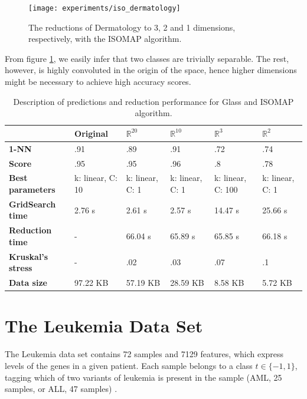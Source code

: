 \begin{figure}[H]
	\centering
	\captionsetup{justification=centering}
	\texttt{[image: experiments/iso\_dermatology]}
	\caption{The reductions of Dermatology to 3, 2 and 1 dimensions, respectively, with the ISOMAP algorithm.}
	\label{fig:dsdermatologyiso}
\end{figure}

From figure \ref{fig:dsdermatologyiso}, we easily infer that two classes are trivially separable. The rest, however, is highly convoluted in the origin of the space, hence higher dimensions might be necessary to achieve high accuracy scores.

\begin{table}[H]
	\centering
	
	\begin{tabular}{|p{.15\linewidth}|p{.12\linewidth}|p{.12\linewidth}|p{.12\linewidth}|p{.12\linewidth}|p{.12\linewidth}|}
		\hline
		& \textbf{Original} & $\mathbb{R}^{20}$ & $\mathbb{R}^{10}$ & $\mathbb{R}^3$ & $\mathbb{R}^2$ \\\hline
		\textbf{1-NN} & .91 & .89 & .91 & .72 & .74 \\\hline
		\textbf{Score} & .95 & .95 & .96 & .8 & .78 \\\hline
		\textbf{Best parameters} & k: linear, C: 10 & k: linear, C: 1 & k: linear, C: 1 & k: linear, C: 100 & k: linear, C: 1\\\hline
		\textbf{GridSearch time} & 2.76 s & 2.61 s & 2.57 s & 14.47 s & 25.66 s \\\hline
		\textbf{Reduction time} & - & 66.04 s & 65.89 s & 65.85 s & 66.18 s \\\hline
		\textbf{Kruskal's stress} & - & .02 & .03 & .07 & .1 \\\hline
		\textbf{Data size} & 97.22 KB & 57.19 KB & 28.59 KB & 8.58 KB & 5.72 KB \\\hline
	\end{tabular}
	\captionsetup{justification=centxLering}
	\caption{Description of predictions and reduction performance for Glass and ISOMAP algorithm.}
\end{table}

\clearpage
\section{The Leukemia Data Set}

The Leukemia data set contains 72 samples and 7129 features, which express levels of the genes in a given patient. Each sample belongs to a class $t \in \{-1, 1\}$, tagging which of two variants of leukemia is present in the sample (AML, 25 samples, or ALL, 47 samples) \cite{on:duc_ds}.
\newline\newline


